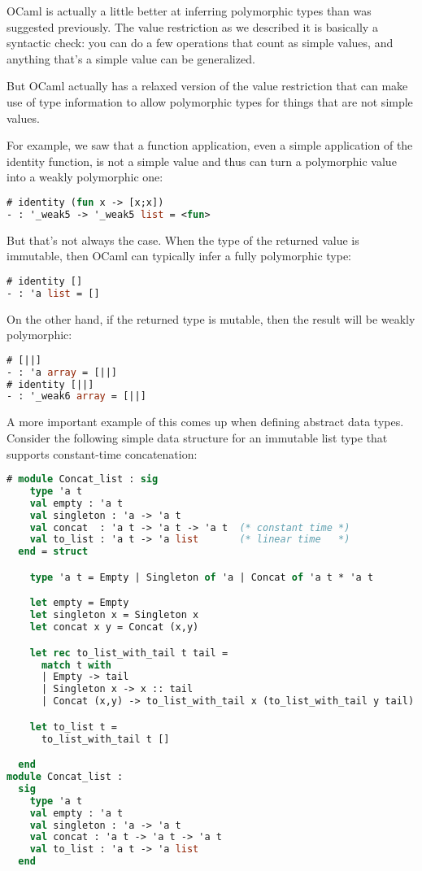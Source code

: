 OCaml is actually a little better at inferring polymorphic types than
was suggested previously. The value restriction as we described it is
basically a syntactic check: you can do a few operations that count as
simple values, and anything that's a simple value can be generalized.

But OCaml actually has a relaxed version of the value restriction that
can make use of type information to allow polymorphic types for things
that are not simple values.

For example, we saw that a function application, even a simple
application of the identity function, is not a simple value and thus can
turn a polymorphic value into a weakly polymorphic one:

\begin{lstlisting}[language=Caml]
# identity (fun x -> [x;x])
- : '_weak5 -> '_weak5 list = <fun>
\end{lstlisting}

But that's not always the case. When the type of the returned value is
immutable, then OCaml can typically infer a fully polymorphic type:

\begin{lstlisting}[language=Caml]
# identity []
- : 'a list = []
\end{lstlisting}

On the other hand, if the returned type is mutable, then the result will
be weakly polymorphic:

\begin{lstlisting}[language=Caml]
# [||]
- : 'a array = [||]
# identity [||]
- : '_weak6 array = [||]
\end{lstlisting}

A more important example of this comes up when defining abstract data
types. Consider the following simple data structure for an immutable
list type that supports constant-time concatenation:

\begin{lstlisting}[language=Caml]
# module Concat_list : sig
    type 'a t
    val empty : 'a t
    val singleton : 'a -> 'a t
    val concat  : 'a t -> 'a t -> 'a t  (* constant time *)
    val to_list : 'a t -> 'a list       (* linear time   *)
  end = struct

    type 'a t = Empty | Singleton of 'a | Concat of 'a t * 'a t

    let empty = Empty
    let singleton x = Singleton x
    let concat x y = Concat (x,y)

    let rec to_list_with_tail t tail =
      match t with
      | Empty -> tail
      | Singleton x -> x :: tail
      | Concat (x,y) -> to_list_with_tail x (to_list_with_tail y tail)

    let to_list t =
      to_list_with_tail t []

  end
module Concat_list :
  sig
    type 'a t
    val empty : 'a t
    val singleton : 'a -> 'a t
    val concat : 'a t -> 'a t -> 'a t
    val to_list : 'a t -> 'a list
  end
\end{lstlisting}


